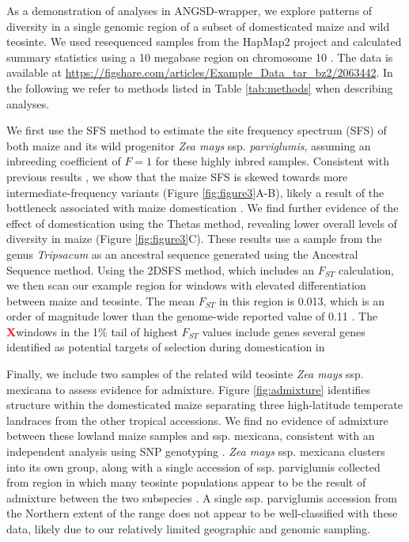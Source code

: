 \documentclass[10pt,a4paper]{article}
\newcommand{\fst}{${F_{ST}}$ }
\newcommand{\X}{\textcolor{red}{\bf X}}
\begin{document}
As a demonstration of analyses in ANGSD-wrapper, we explore patterns of diversity in a single genomic region of a subset of domesticated maize and wild teosinte. We used resequenced samples from the HapMap2 project  and calculated summary statistics using a 10 megabase region on chromosome 10 \citep{chia2012maize}. The data is available at \url{https://figshare.com/articles/Example_Data_tar_bz2/2063442}. In the following we refer to methods listed in Table \ref{tab:methods} when describing analyses.

We first use the SFS method to estimate the site frequency spectrum (SFS) of both maize and its wild progenitor \textit{Zea mays} ssp. \textit{parviglumis}, assuming an inbreeding coefficient of $F=1$ for these highly inbred samples. 
Consistent with previous results \citep{hufford2012comparative}, we show that the maize SFS is skewed towards more intermediate-frequency variants (Figure \ref{fig:figure3}A-B), likely a result of the bottleneck associated with maize domestication \citep{Beissinger031666}.
We find further evidence of the effect of domestication using the Thetas method, revealing lower overall levels of diversity in maize (Figure \ref{fig:figure3}C). 
These results use a sample from the genus \textit{Tripsacum} as an ancestral sequence generated using the Ancestral Sequence method. 
Using the 2DSFS method, which includes an \fst calculation, we then scan our example region for windows with elevated differentiation between maize and teosinte. 
The mean \fst in this region is 0.013, which is an order of magnitude lower than the genome-wide reported value of 0.11 \citep{hufford2012comparative}.   
The \X windows in the 1\% tail of highest \fst values include genes several genes identified as potential targets of selection during domestication in \citep{hufford2012comparative} 

Finally, we include two samples of the related wild teosinte \textit{Zea mays} ssp. {mexicana} to assess evidence for admixture.  
Figure \ref{fig:admixture} identifies structure within the domesticated maize separating three high-latitude temperate landraces from the other tropical accessions. 
We find no evidence of admixture between these lowland maize samples and  ssp. {mexicana}, consistent with an independent analysis using SNP genotyping \citep{hufford2013genomic}.
\textit{Zea mays} ssp. {mexicana} clusters into its own group, along with a single accession of ssp. {parviglumis} collected from region in which many teosinte populations appear to be the result of admixture between the two subspecies \citep{fang2012megabase}.  
A single  ssp. {parviglumis} accession from the Northern extent of the range does not appear to be well-classified with these data, likely due to our relatively limited geographic and genomic sampling.
\end{document}
